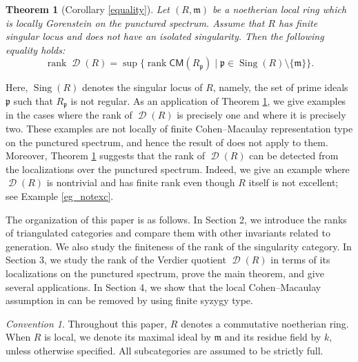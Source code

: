 \documentclass[10pt]{amsart}
\newtheorem{thm}{Theorem}[section]
\theoremstyle{definition}
\theoremstyle{remark}
\newtheorem*{conv}{Convention}
\numberwithin{equation}{thm}
\def\CM{\mathsf{CM}}
\def\d{\operatorname{\mathscr{D}}}
\def\m{\mathfrak{m}}
\def\p{\mathfrak{p}}
\def\rank{\operatorname{rank}}
\def\Sing{\operatorname{Sing}}
\def\sup{\operatorname{sup}}
\begin{document}
\begin{thm}[Corollary \ref{equality}]\label{thm_int}
Let $(R,\m)$ be a noetherian local ring which is locally Gorenstein on the punctured spectrum.
Assume that $R$ has finite singular locus and does not have an isolated singularity.
Then the following equality holds:
\[
\rank\d(R)=\sup\{\rank\CM(R_{\p})\mid\p\in\Sing(R)\setminus\{\m\}\}.
\]
\end{thm}
Here, $\Sing(R)$ denotes the singular locus of $R$, namely, the set of prime ideals $\p$ such that $R_{\p}$ is not regular.
As an application of Theorem \ref{thm_int}, we give examples in the cases where the rank of $\d(R)$ is precisely one and where it is precisely two.
These examples are not locally of finite Cohen--Macaulay representation type on the punctured spectrum, and hence the result of \cite{MT} does not apply to them.
Moreover, Theorem \ref{thm_int} suggests that the rank of $\d(R)$ can be detected from the localizations over the punctured spectrum.
Indeed, we give an example where $\d(R)$ is nontrivial and has finite rank even though $R$ itself is not excellent; see Example \ref{eg_notexc}.

The organization of this paper is as follows.
In Section 2, we introduce the ranks of triangulated categories and compare them with other invariants related to generation. 
We also study the finiteness of the rank of the singularity category.
In Section 3, we study the rank of the Verdier quotient $\d(R)$ in terms of its localizations on the punctured spectrum, prove the main theorem, and give several applications.
In Section 4, we show that the local Cohen--Macaulay assumption in \cite[Theorem 4.7]{MT} can be removed by using finite syzygy type.
\begin{conv}
Throughout this paper, $R$ denotes a commutative noetherian ring.
When $R$ is local, we denote its maximal ideal by $\m$ and its residue field by $k$, unless otherwise specified.
All subcategories are assumed to be strictly full.
\end{conv}
\end{document}
